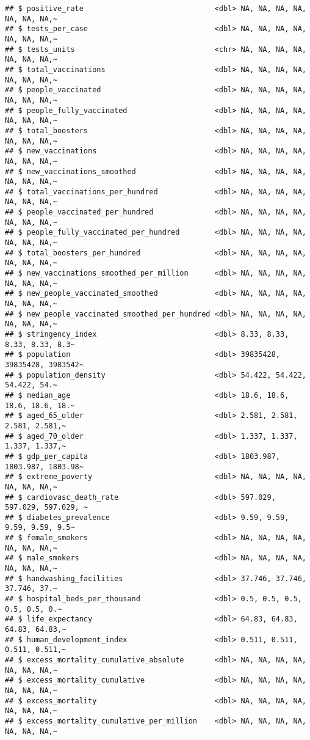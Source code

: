 \documentclass[
]{book}
\begin{document}
\begin{verbatim}
## $ positive_rate                              <dbl> NA, NA, NA, NA, NA, NA, NA,~
## $ tests_per_case                             <dbl> NA, NA, NA, NA, NA, NA, NA,~
## $ tests_units                                <chr> NA, NA, NA, NA, NA, NA, NA,~
## $ total_vaccinations                         <dbl> NA, NA, NA, NA, NA, NA, NA,~
## $ people_vaccinated                          <dbl> NA, NA, NA, NA, NA, NA, NA,~
## $ people_fully_vaccinated                    <dbl> NA, NA, NA, NA, NA, NA, NA,~
## $ total_boosters                             <dbl> NA, NA, NA, NA, NA, NA, NA,~
## $ new_vaccinations                           <dbl> NA, NA, NA, NA, NA, NA, NA,~
## $ new_vaccinations_smoothed                  <dbl> NA, NA, NA, NA, NA, NA, NA,~
## $ total_vaccinations_per_hundred             <dbl> NA, NA, NA, NA, NA, NA, NA,~
## $ people_vaccinated_per_hundred              <dbl> NA, NA, NA, NA, NA, NA, NA,~
## $ people_fully_vaccinated_per_hundred        <dbl> NA, NA, NA, NA, NA, NA, NA,~
## $ total_boosters_per_hundred                 <dbl> NA, NA, NA, NA, NA, NA, NA,~
## $ new_vaccinations_smoothed_per_million      <dbl> NA, NA, NA, NA, NA, NA, NA,~
## $ new_people_vaccinated_smoothed             <dbl> NA, NA, NA, NA, NA, NA, NA,~
## $ new_people_vaccinated_smoothed_per_hundred <dbl> NA, NA, NA, NA, NA, NA, NA,~
## $ stringency_index                           <dbl> 8.33, 8.33, 8.33, 8.33, 8.3~
## $ population                                 <dbl> 39835428, 39835428, 3983542~
## $ population_density                         <dbl> 54.422, 54.422, 54.422, 54.~
## $ median_age                                 <dbl> 18.6, 18.6, 18.6, 18.6, 18.~
## $ aged_65_older                              <dbl> 2.581, 2.581, 2.581, 2.581,~
## $ aged_70_older                              <dbl> 1.337, 1.337, 1.337, 1.337,~
## $ gdp_per_capita                             <dbl> 1803.987, 1803.987, 1803.98~
## $ extreme_poverty                            <dbl> NA, NA, NA, NA, NA, NA, NA,~
## $ cardiovasc_death_rate                      <dbl> 597.029, 597.029, 597.029, ~
## $ diabetes_prevalence                        <dbl> 9.59, 9.59, 9.59, 9.59, 9.5~
## $ female_smokers                             <dbl> NA, NA, NA, NA, NA, NA, NA,~
## $ male_smokers                               <dbl> NA, NA, NA, NA, NA, NA, NA,~
## $ handwashing_facilities                     <dbl> 37.746, 37.746, 37.746, 37.~
## $ hospital_beds_per_thousand                 <dbl> 0.5, 0.5, 0.5, 0.5, 0.5, 0.~
## $ life_expectancy                            <dbl> 64.83, 64.83, 64.83, 64.83,~
## $ human_development_index                    <dbl> 0.511, 0.511, 0.511, 0.511,~
## $ excess_mortality_cumulative_absolute       <dbl> NA, NA, NA, NA, NA, NA, NA,~
## $ excess_mortality_cumulative                <dbl> NA, NA, NA, NA, NA, NA, NA,~
## $ excess_mortality                           <dbl> NA, NA, NA, NA, NA, NA, NA,~
## $ excess_mortality_cumulative_per_million    <dbl> NA, NA, NA, NA, NA, NA, NA,~
\end{verbatim}
\end{document}
